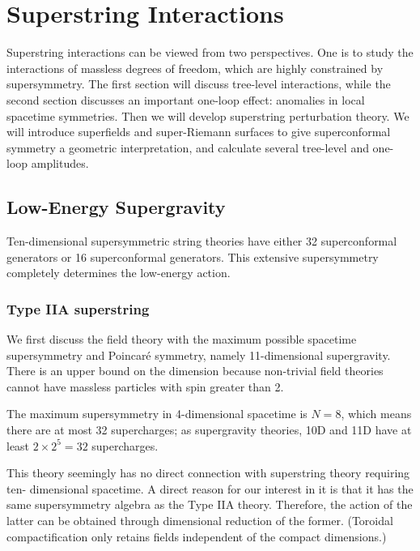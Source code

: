 \chapter{\texorpdfstring{Superstring Interactions}{12 Superstring Interactions}} \label{cha:12}

Superstring interactions can be viewed from two perspectives. One is to study the interactions of massless degrees of freedom, which are highly constrained by supersymmetry. The first section will discuss tree-level interactions, while the second section discusses an important one-loop effect: anomalies in local spacetime symmetries. Then we will develop superstring perturbation theory. We will introduce superfields and super-Riemann surfaces to give superconformal symmetry a geometric interpretation, and calculate several tree-level and one-loop amplitudes.

\section{Low-Energy Supergravity}

Ten-dimensional supersymmetric string theories have either 32 superconformal generators or 16 superconformal generators. This extensive supersymmetry completely determines the low-energy action.

\subsection*{Type IIA superstring}

We first discuss the field theory with the maximum possible spacetime supersymmetry and Poincaré symmetry, namely 11-dimensional supergravity. There is an upper bound on the dimension because non-trivial field theories cannot have massless particles with spin greater than 2.

\begin{tcolorbox}[breakable]
	The maximum supersymmetry in 4-dimensional spacetime is $N=8$, which means there are at most 32 supercharges; as supergravity theories, 10D and 11D have at least $2 \times 2^5 = 32$ supercharges.
\end{tcolorbox}

This theory seemingly has no direct connection with superstring theory requiring ten- dimensional spacetime. A direct reason for our interest in it is that it has the same supersymmetry algebra as the Type IIA theory. Therefore, the action of the latter can be obtained through dimensional reduction of the former. (Toroidal compactification only retains fields independent of the compact dimensions.)


